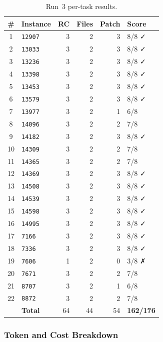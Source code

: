\begin{table}[h]
\centering
\small
\caption{Run~3 per-task results.}\label{tab:r3-tasks}
\setlength{\tabcolsep}{4pt}
\begin{tabular}{clrrrl}
\toprule
\textbf{\#} & \textbf{Instance} & \textbf{RC} & \textbf{Files} & \textbf{Patch} & \textbf{Score} \\
\midrule
 1 & \texttt{12907} & 3 & 2 & 3 & 8/8 ✓ \\
 2 & \texttt{13033} & 3 & 2 & 3 & 8/8 ✓ \\
 3 & \texttt{13236} & 3 & 2 & 3 & 8/8 ✓ \\
 4 & \texttt{13398} & 3 & 2 & 3 & 8/8 ✓ \\
 5 & \texttt{13453} & 3 & 2 & 3 & 8/8 ✓ \\
 6 & \texttt{13579} & 3 & 2 & 3 & 8/8 ✓ \\
 7 & \texttt{13977} & 3 & 2 & 1 & 6/8 \\
 8 & \texttt{14096} & 3 & 2 & 2 & 7/8 \\
 9 & \texttt{14182} & 3 & 2 & 3 & 8/8 ✓ \\
10 & \texttt{14309} & 3 & 2 & 2 & 7/8 \\
11 & \texttt{14365} & 3 & 2 & 2 & 7/8 \\
12 & \texttt{14369} & 3 & 2 & 3 & 8/8 ✓ \\
13 & \texttt{14508} & 3 & 2 & 3 & 8/8 ✓ \\
14 & \texttt{14539} & 3 & 2 & 3 & 8/8 ✓ \\
15 & \texttt{14598} & 3 & 2 & 3 & 8/8 ✓ \\
16 & \texttt{14995} & 3 & 2 & 3 & 8/8 ✓ \\
17 & \texttt{7166}  & 3 & 2 & 3 & 8/8 ✓ \\
18 & \texttt{7336}  & 3 & 2 & 3 & 8/8 ✓ \\
19 & \texttt{7606}  & 1 & 2 & 0 & 3/8 ✗ \\
20 & \texttt{7671}  & 3 & 2 & 2 & 7/8 \\
21 & \texttt{8707}  & 3 & 2 & 1 & 6/8 \\
22 & \texttt{8872}  & 3 & 2 & 2 & 7/8 \\
\midrule
   & \textbf{Total} & 64 & 44 & 54 & \textbf{162/176} \\
\bottomrule
\end{tabular}
\end{table}

\subsubsection{Token and Cost Breakdown}

